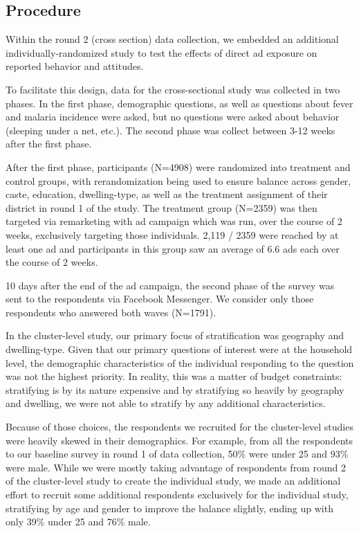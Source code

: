 \documentclass[a4paper,12pt]{article}
\begin{document}
\subsection{Procedure}

Within the round 2 (cross section) data collection, we embedded an additional individually-randomized study to test the effects of direct ad exposure on reported behavior and attitudes.

To facilitate this design, data for the cross-sectional study was collected in two phases. In the first phase, demographic questions, as well as questions about fever and malaria incidence were asked, but no questions were asked about behavior (sleeping under a net, etc.). The second phase was collect between 3-12 weeks after the first phase.

After the first phase, participants (N=4908) were randomized into treatment and control groups, with rerandomization being used to ensure balance across gender, caste, education, dwelling-type, as well as the treatment assignment of their district in round 1 of the study. The treatment group (N=2359) was then targeted via remarketing with ad campaign which was run, over the course of 2 weeks, exclusively targeting those individuals. 2,119 / 2359 were reached by at least one ad and participants in this group saw an average of 6.6 ads each over the course of 2 weeks.

10 days after the end of the ad campaign, the second phase of the survey was sent to the respondents via Facebook Messenger. We consider only those respondents who answered both waves (N=1791).

In the cluster-level study, our primary focus of stratification was geography and dwelling-type. Given that our primary questions of interest were at the household level, the demographic characteristics of the individual responding to the question was not the highest priority. In reality, this was a matter of budget constraints: stratifying is by its nature expensive and by stratifying so heavily by geography and dwelling, we were not able to stratify by any additional characteristics.

Because of those choices, the respondents we recruited for the cluster-level studies were heavily skewed in their demographics. For example, from all the respondents to our baseline survey in round 1 of data collection, 50\% were under 25 and 93\% were male. While we were mostly taking advantage of respondents from round 2 of the cluster-level study to create the individual study, we made an additional effort to recruit some additional respondents exclusively for the individual study, stratifying by age and gender to improve the balance slightly, ending up with only 39\% under 25 and 76\% male.
\end{document}
